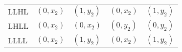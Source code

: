 \begin{tabular}{lrrrr}
LLHL  & \multicolumn{1}{l}{$( 0 , x_2 )$} & \multicolumn{1}{l}{$( 1 , y_2 )$} & \multicolumn{1}{l}{$( 0 , x_2 )$} & \multicolumn{1}{l}{$( 1 , y_2 )$} \\
LHLL  & \multicolumn{1}{l}{$( 0 , x_2 )$} & \multicolumn{1}{l}{$( 0 , x_2 )$} & \multicolumn{1}{l}{$( 0 , y_2 )$} & \multicolumn{1}{l}{$( 0 , y_2 )$} \\
LLLL  & \multicolumn{1}{l}{$( 0 , x_2 )$} & \multicolumn{1}{l}{$( 1 , y_2 )$} & \multicolumn{1}{l}{$( 0 , x_2 )$} & \multicolumn{1}{l}{$( 1 , y_2 )$} \\
\bottomrule
\end{tabular}%

